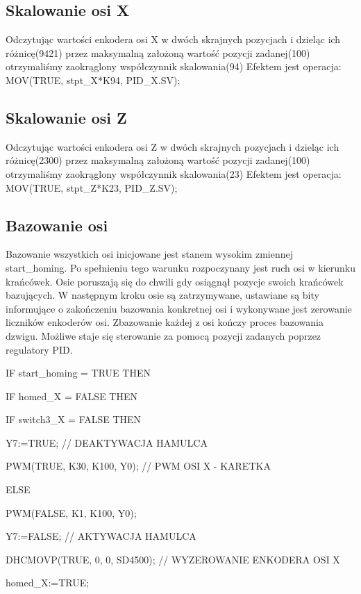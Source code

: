 \documentclass{mwrep}
\begin{document}
\subsection{Skalowanie osi X}
	Odczytując wartości enkodera osi X w dwóch skrajnych pozycjach i dzieląc ich różnicę(9421) przez maksymalną założoną wartość pozycji zadanej(100) otrzymaliśmy zaokrąglony współczynnik skalowania(94)
 Efektem jest operacja:
MOV(TRUE, stpt\_X*K94, PID\_X.SV);

\subsection{Skalowanie osi Z}
	Odczytując wartości enkodera osi Z w dwóch skrajnych pozycjach i dzieląc ich różnicę(2300) przez maksymalną założoną wartość pozycji zadanej(100) otrzymaliśmy zaokrąglony współczynnik skalowania(23)
 Efektem jest operacja:
MOV(TRUE, stpt\_Z*K23, PID\_Z.SV);

\subsection{Bazowanie osi}
Bazowanie wszystkich osi inicjowane jest stanem wysokim zmiennej start\_homing. Po spełnieniu tego warunku rozpoczynany jest ruch osi w kierunku krańcówek. Osie poruszają się do chwili gdy osiągnął pozycje swoich krańcówek bazujących. W następnym kroku osie są zatrzymywane, ustawiane są bity informujące o zakończeniu bazowania konkretnej osi i wykonywane jest zerowanie liczników enkoderów osi.
Zbazowanie każdej z osi kończy proces bazowania dzwigu. Możliwe staje się sterowanie za pomocą pozycji zadanych poprzez regulatory PID.



IF start\_homing = TRUE THEN
	
\quad IF homed\_X = FALSE THEN
		
\quad \quad IF switch3\_X = FALSE THEN

\quad \quad \quad Y7:=TRUE; // DEAKTYWACJA HAMULCA

\quad \quad \quad PWM(TRUE, K30, K100, Y0); // PWM OSI X - KARETKA

\quad \quad \quad ELSE

\quad \quad \quad PWM(FALSE, K1, K100, Y0);

\quad \quad \quad Y7:=FALSE; // AKTYWACJA HAMULCA

\quad \quad \quad DHCMOVP(TRUE, 0, 0, SD4500); // WYZEROWANIE ENKODERA OSI X

\quad \quad \quad homed\_X:=TRUE;
\end{document}
